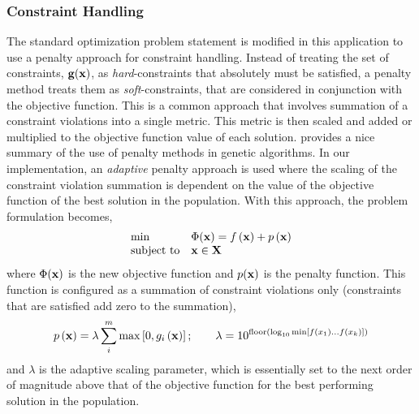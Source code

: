 \subsubsection{Constraint Handling}
The standard optimization problem statement is modified in this
application to use a penalty approach for constraint handling.  Instead
of treating the set of constraints, $\mathbf{g}(\mathbf{x})$, as
\textit{hard}-constraints that absolutely must be satisfied, a penalty
method treats them as \textit{soft}-constraints, that are considered in
conjunction with the objective function.  This is a common approach that
involves summation of a constraint violations into a single metric.
This metric is then scaled and added or multiplied to the objective
function value of each solution.  \citet{yeniay05} provides a nice
summary of the use of penalty methods in genetic algorithms.  In our
implementation, an \textit{adaptive} penalty approach is used where the
scaling of the constraint violation summation is dependent on the value
of the objective function of the best solution in the population.  With
this approach, the problem formulation becomes,
\begin{equation}
\begin{array}{ll}
  \min & \Phi(\mathbf{x}) = f\left(\mathbf{x}\right) + p\left(\mathbf{x}\right)\\
  \text{subject to}& \mathbf{x} \in \mathbf{X}\\
  \end{array}
\end{equation}
where $\Phi(\mathbf{x})$ is the new objective function and $p(\mathbf{x})$ is
the penalty function.  This function is configured as a summation of
constraint violations only (constraints that are satisfied add zero to the summation),
\begin{equation}
p\left(\mathbf{x}\right) = \lambda \sum_i^m \max\left[0,g_i
  \left(\mathbf{x}\right)\right];
\qquad \lambda = 10^{\text{floor} \left( \log_{10} \min\left[f\left(x_1\right)
  \ldots f\left(x_k\right) \right] \right)}
\end{equation}
and $\lambda$ is the adaptive scaling parameter, which is essentially
set to the next order of magnitude above that of the objective function
for the best performing solution in the population.

